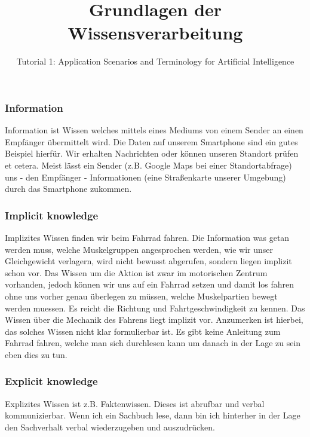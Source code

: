 \documentclass[10pt,a4wide]{scrartcl}
\author{}
\title{Grundlagen der Wissensverarbeitung}
\subtitle{Tutorial 1: Application Scenarios and Terminology for Artificial Intelligence}
\date{}
\begin{document}
	\maketitle
	\setcounter{section}{1}
	\setcounter{subsection}{1}
	\subsection{}
	\subsubsection{Information}
		Information ist Wissen welches mittels eines Mediums von einem Sender an einen Empfänger übermittelt wird. Die Daten auf unserem Smartphone sind ein gutes Beispiel hierfür. Wir erhalten Nachrichten oder können unseren Standort prüfen et cetera. Meist lässt ein Sender (z.B. Google Maps bei einer Standortabfrage) uns - den Empfänger - Informationen (eine Straßenkarte unserer Umgebung) durch das Smartphone zukommen.
		
		\subsubsection{Implicit knowledge}
		Implizites Wissen finden wir beim Fahrrad fahren. Die Information was getan werden muss, welche Muskelgruppen angesprochen werden, wie wir unser Gleichgewicht verlagern, wird nicht bewusst abgerufen, sondern liegen implizit schon vor. Das Wissen um die Aktion ist	zwar im motorischen Zentrum vorhanden, jedoch können wir uns auf ein Fahrrad
		setzen und damit los fahren ohne uns vorher genau überlegen zu müssen, welche Muskelpartien bewegt werden muessen. Es reicht die Richtung und Fahrtgeschwindigkeit zu kennen. Das Wissen über die Mechanik des Fahrens liegt implizit vor. Anzumerken ist hierbei, das solches Wissen nicht klar formulierbar ist. Es gibt keine Anleitung zum Fahrrad fahren, welche man sich durchlesen kann um danach in der Lage zu sein eben dies zu tun.
		
		\subsubsection{Explicit knowledge}
		Explizites Wissen ist z.B. Faktenwissen. Dieses ist abrufbar und verbal kommunizierbar. Wenn ich ein Sachbuch lese, dann bin ich hinterher in der Lage den Sachverhalt verbal wiederzugeben und auszudrücken.
		
		\newpage		
		
\end{document}
